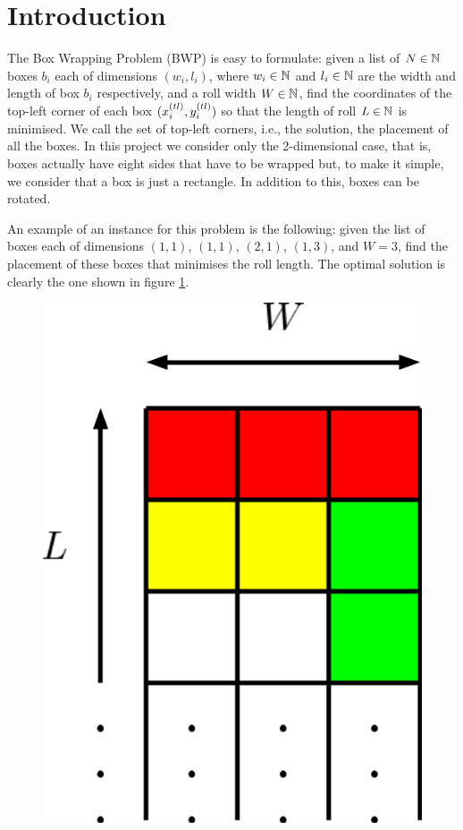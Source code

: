 \section{Introduction}
\label{sec:introduction}

The Box Wrapping Problem (BWP) is easy to formulate: given a list of $N \in \mathbb{N}$ boxes
$b_i$ each of dimensions $(w_i, l_i)$, where $w_i \in \mathbb{N}$ and $l_i \in \mathbb{N}$
are the width and length of box $b_i$ respectively, and a roll width $W \in \mathbb{N}$,
find the coordinates of  the top-left corner of each box $(\Xtl[i], \Ytl[i])$ so that
the length of roll $L \in \mathbb{N}$ is minimised. We call the set of top-left corners, i.e.,
the solution, the placement of all the boxes. In this project we consider only the
2-dimensional case, that is, boxes actually have eight sides that have to be wrapped but,
to make it simple, we consider that a box is just a rectangle. In addition to this, boxes
can be rotated.

\hfill

An example of an instance for this problem is the following: given the list of boxes each
of dimensions $(1,1)$, $(1,1)$, $(2,1)$, $(1,3)$, and $W=3$, find the placement of these
boxes that minimises the roll length. The optimal solution is clearly the one shown
in figure \ref{fig:example-placement}.

\begin{figure}[H]
    \centering
    \includegraphics[scale=0.175]{example-placement}
    \label{fig:example-placement}
\end{figure}
